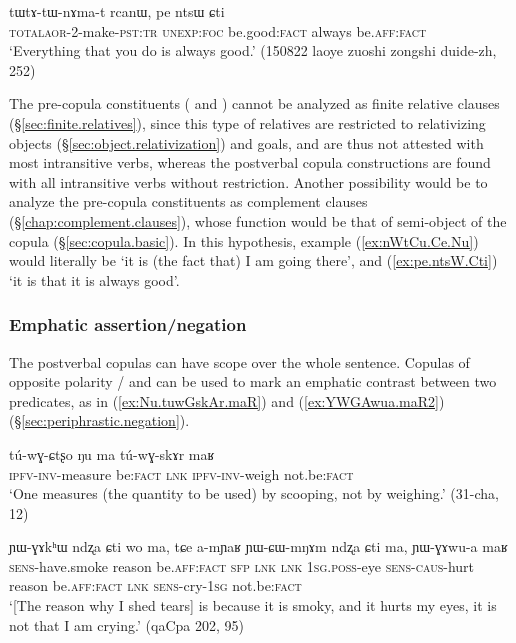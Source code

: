 \begin{exe}
\ex \label{ex:pe.ntsW.Cti}
\gll  tɯ\redp{}tɤ-tɯ-nɤma-t rcanɯ, pe ntsɯ ɕti\\
\textsc{total}\redp{}\textsc{aor}-2-make-\textsc{pst}:\textsc{tr} \textsc{unexp}:\textsc{foc} be.good:\textsc{fact} always be.\textsc{aff}:\textsc{fact}\\
\glt `Everything that you do is always good.' (150822 laoye zuoshi zongshi duide-zh, 252)
\end{exe}

The pre-copula constituents ( and ) cannot be analyzed as finite relative clauses (§\ref{sec:finite.relatives}), since this type of relatives are restricted to relativizing objects (§\ref{sec:object.relativization}) and goals, and are thus not attested with most intransitive verbs, whereas the postverbal copula constructions are found with all intransitive verbs without restriction. Another possibility would be to analyze the pre-copula constituents as complement clauses (§\ref{chap:complement.clauses}), whose function would be that of semi-object of the copula (§\ref{sec:copula.basic}). In this hypothesis, example (\ref{ex:nWtCu.Ce.Nu}) would literally be `it is (the fact that) I am going there', and (\ref{ex:pe.ntsW.Cti}) `it is that it is always good'.

 
\subsubsection{Emphatic assertion/negation} \label{sec:affirmative.copula.function}
The postverbal copulas can have scope over the whole sentence. Copulas of opposite polarity / and  can be used to mark an emphatic contrast between two predicates, as in (\ref{ex:Nu.tuwGskAr.maR}) and (\ref{ex:YWGAwua.maR2}) (§\ref{sec:periphrastic.negation}).

\begin{exe}
\ex \label{ex:Nu.tuwGskAr.maR}
\gll  tú-wɣ-ɕtʂo ŋu ma tú-wɣ-skɤr maʁ \\
\textsc{ipfv}-\textsc{inv}-measure be:\textsc{fact} \textsc{lnk} \textsc{ipfv}-\textsc{inv}-weigh not.be:\textsc{fact} \\
\glt `One measures (the quantity to be used) by scooping, not by weighing.' (31-cha, 12)
\end{exe}

\begin{exe}
\ex \label{ex:YWGAwua.maR2}
\gll ɲɯ-ɣɤkʰɯ ndʐa ɕti wo ma, tɕe a-mɲaʁ ɲɯ-ɕɯ-mŋɤm ndʐa ɕti ma, ɲɯ-ɣɤwu-a maʁ \\
\textsc{sens}-have.smoke reason be.\textsc{aff}:\textsc{fact} \textsc{sfp} \textsc{lnk} \textsc{lnk} \textsc{1sg}.\textsc{poss}-eye \textsc{sens}-\textsc{caus}-hurt reason be.\textsc{aff}:\textsc{fact} \textsc{lnk} \textsc{sens}-cry-\textsc{1sg} not.be:\textsc{fact} \\
\glt `[The reason why I shed tears] is because it is smoky, and it hurts my eyes, it is not that I am crying.' (qaCpa 202, 95)
\end{exe}


